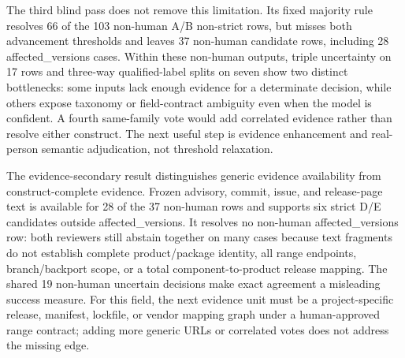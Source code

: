 The third blind pass does not remove this limitation. Its fixed majority rule resolves 66 of the 103 non-human A/B non-strict rows, but misses both advancement thresholds and leaves 37 non-human candidate rows, including 28 affected\_versions cases. Within these non-human outputs, triple uncertainty on 17 rows and three-way qualified-label splits on seven show two distinct bottlenecks: some inputs lack enough evidence for a determinate decision, while others expose taxonomy or field-contract ambiguity even when the model is confident. A fourth same-family vote would add correlated evidence rather than resolve either construct. The next useful step is evidence enhancement and real-person semantic adjudication, not threshold relaxation.

The evidence-secondary result distinguishes generic evidence availability from construct-complete evidence. Frozen advisory, commit, issue, and release-page text is available for 28 of the 37 non-human rows and supports six strict D/E candidates outside affected\_versions. It resolves no non-human affected\_versions row: both reviewers still abstain together on many cases because text fragments do not establish complete product/package identity, all range endpoints, branch/backport scope, or a total component-to-product release mapping. The shared 19 non-human uncertain decisions make exact agreement a misleading success measure. For this field, the next evidence unit must be a project-specific release, manifest, lockfile, or vendor mapping graph under a human-approved range contract; adding more generic URLs or correlated votes does not address the missing edge.

